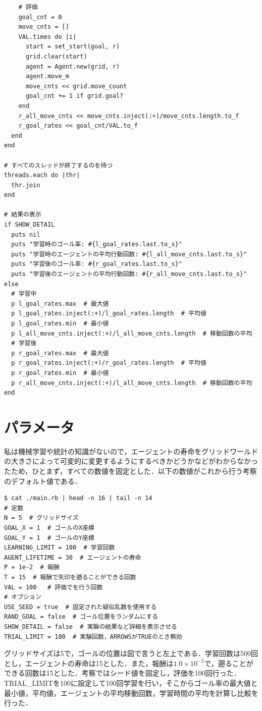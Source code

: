 \documentclass[a4j,11pt]{jarticle}
\begin{document}
\begin{verbatim}
    # 評価
    goal_cnt = 0
    move_cnts = []
    VAL.times do |i|
      start = set_start(goal, r)
      grid.clear(start)
      agent = Agent.new(grid, r)
      agent.move_m
      move_cnts << grid.move_count
      goal_cnt += 1 if grid.goal?
    end
    r_all_move_cnts << move_cnts.inject(:+)/move_cnts.length.to_f
    r_goal_rates << goal_cnt/VAL.to_f
  end
end

# すべてのスレッドが終了するのを待つ
threads.each do |thr|
  thr.join
end

# 結果の表示
if SHOW_DETAIL
  puts nil
  puts "学習時のゴール率: #{l_goal_rates.last.to_s}"
  puts "学習時のエージェントの平均行動回数: #{l_all_move_cnts.last.to_s}"
  puts "学習後のゴール率: #{r_goal_rates.last.to_s}"
  puts "学習後のエージェントの平均行動回数: #{r_all_move_cnts.last.to_s}"
else
  # 学習中
  p l_goal_rates.max  # 最大値
  p l_goal_rates.inject(:+)/l_goal_rates.length  # 平均値
  p l_goal_rates.min  # 最小値
  p l_all_move_cnts.inject(:+)/l_all_move_cnts.length  # 移動回数の平均
  # 学習後
  p r_goal_rates.max  # 最大値
  p r_goal_rates.inject(:+)/r_goal_rates.length  # 平均値
  p r_goal_rates.min  # 最小値
  p r_all_move_cnts.inject(:+)/l_all_move_cnts.length  # 移動回数の平均
end
\end{verbatim}

\newpage

\section{パラメータ}

私は機械学習や統計の知識がないので，エージェントの寿命をグリッドワールドの大きさによって可変的に変更するようにするべきかどうかなどがわからなかったため，ひとまず，すべての数値を固定とした．以下の数値がこれから行う考察のデフォルト値である．

\begin{verbatim}
$ cat ./main.rb | head -n 16 | tail -n 14
# 定数
N = 5  # グリッドサイズ
GOAL_X = 1  # ゴールのX座標
GOAL_Y = 1  # ゴールのY座標
LEARNING_LIMIT = 100  # 学習回数
AGENT_LIFETIME = 30  # エージェントの寿命
P = 1e-2  # 報酬
T = 15  # 報酬で矢印を遡ることができる回数
VAL = 100   # 評価でを行う回数
# オプション
USE_SEED = true  # 固定された疑似乱数を使用する
RAND_GOAL = false  # ゴール位置をランダムにする
SHOW_DETAIL = false  # 実験の結果など詳細を表示させる
TRIAL_LIMIT = 100  # 実験回数，ARROWSがTRUEのとき無効
\end{verbatim}

グリッドサイズは5で，ゴールの位置は図で言うと左上である．学習回数は500回とし，エージェントの寿命は15とした．また，報酬は$1.0×10^{-2}$で，遡ることができる回数は15とした．考察ではシード値を固定し，評価を100回行った．TRIAL\_LIMITを100に設定して100回学習を行い，そこからゴール率の最大値と最小値，平均値，エージェントの平均移動回数，学習時間の平均を計算し比較を行った．
\end{document}
